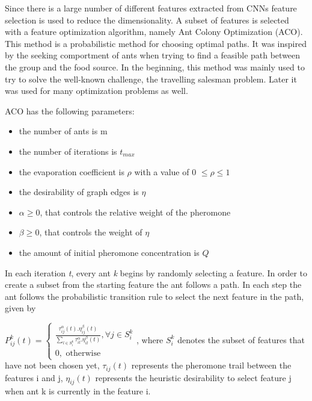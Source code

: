 Since there is a large number of different features extracted from CNNs feature selection is used to reduce the dimensionality. A subset of features is selected with a feature optimization algorithm, namely Ant Colony Optimization (ACO). This method is a probabilistic method for choosing optimal paths. It was inspired by the seeking comportment of ants when trying to find a feasible path between the group and the food source. In the beginning, this method was mainly used to try to solve the well-known challenge, the travelling salesman problem. Later it was used for many optimization problems as well.

ACO has the following parameters:
\begin{itemize}

    \item{the number of ants is m}
    \item{the number of iterations is $t_{max}$}
    \item{the evaporation coefficient is $\rho$ with a value of 0 $\le \rho \le 1$}
    \item{the desirability of graph edges is $\eta$}
    \item{$\alpha \ge 0$, that controls the relative weight of the pheromone}
    \item{$\beta \ge 0$, that controls the weight of $\eta$}
    \item{the amount of initial pheromone concentration is $Q$}

\end{itemize}

In each iteration \emph{t}, every ant \emph{k} begins by randomly selecting a feature. In order to create a subset from the starting feature the ant follows a path. In each step the ant follows the probabilistic transition rule to select the next feature in the path, given by 

$P_{ij}^k\left(t\right)=\left\{\begin{array}{l}\frac{\tau_{ij}^\alpha\left(t\right).\eta_{ij}^\beta\left(t\right)}{\sum_{l\in S_i^k}\tau_{il}^\alpha.\eta_{il}^\beta\left(t\right)},\forall j\in S_i^k\\0,\,\,{\text{otherwise}}\end{array}\right.$,
where $S_{i}^{k}$ denotes the subset of features that have not been chosen yet, $\tau_{ij}(t)$ represents the pheromone trail between the features i and j, $\eta_{ij}(t)$ represents the heuristic desirability to select feature j when ant k is currently in the feature i.

